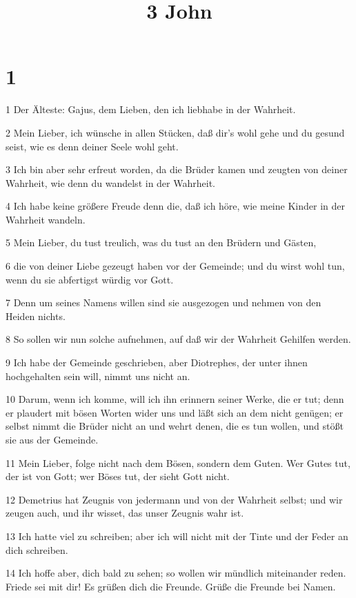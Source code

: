 

\title{3 John}


\chapter{1}

\par 1 Der Älteste: Gajus, dem Lieben, den ich liebhabe in der Wahrheit.
\par 2 Mein Lieber, ich wünsche in allen Stücken, daß dir's wohl gehe und du gesund seist, wie es denn deiner Seele wohl geht.
\par 3 Ich bin aber sehr erfreut worden, da die Brüder kamen und zeugten von deiner Wahrheit, wie denn du wandelst in der Wahrheit.
\par 4 Ich habe keine größere Freude denn die, daß ich höre, wie meine Kinder in der Wahrheit wandeln.
\par 5 Mein Lieber, du tust treulich, was du tust an den Brüdern und Gästen,
\par 6 die von deiner Liebe gezeugt haben vor der Gemeinde; und du wirst wohl tun, wenn du sie abfertigst würdig vor Gott.
\par 7 Denn um seines Namens willen sind sie ausgezogen und nehmen von den Heiden nichts.
\par 8 So sollen wir nun solche aufnehmen, auf daß wir der Wahrheit Gehilfen werden.
\par 9 Ich habe der Gemeinde geschrieben, aber Diotrephes, der unter ihnen hochgehalten sein will, nimmt uns nicht an.
\par 10 Darum, wenn ich komme, will ich ihn erinnern seiner Werke, die er tut; denn er plaudert mit bösen Worten wider uns und läßt sich an dem nicht genügen; er selbst nimmt die Brüder nicht an und wehrt denen, die es tun wollen, und stößt sie aus der Gemeinde.
\par 11 Mein Lieber, folge nicht nach dem Bösen, sondern dem Guten. Wer Gutes tut, der ist von Gott; wer Böses tut, der sieht Gott nicht.
\par 12 Demetrius hat Zeugnis von jedermann und von der Wahrheit selbst; und wir zeugen auch, und ihr wisset, das unser Zeugnis wahr ist.
\par 13 Ich hatte viel zu schreiben; aber ich will nicht mit der Tinte und der Feder an dich schreiben.
\par 14 Ich hoffe aber, dich bald zu sehen; so wollen wir mündlich miteinander reden. Friede sei mit dir! Es grüßen dich die Freunde. Grüße die Freunde bei Namen.

